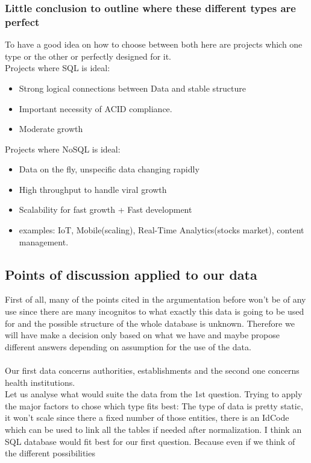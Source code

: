 \documentclass[8pt]{article}
\begin{document}
\begin{itemize}
\subsubsection{Little conclusion to outline where these different types are perfect}
To have a good idea on how to choose between both here are projects which one type or the other or perfectly designed for it.\\
Projects where SQL is ideal:\\
\begin{itemize}
\item Strong logical connections between Data and stable structure
\item Important necessity of ACID compliance.
\item Moderate growth
\end{itemize}
Projects where NoSQL is ideal:\\
\begin{itemize}
\item Data on the fly, unspecific data changing rapidly
\item High throughput to handle viral growth
\item Scalability for fast growth + Fast development
\item examples: IoT, Mobile(scaling), Real-Time Analytics(stocks market), content management.
\end{itemize}
\cite{MongoDB:2016} \cite{McNulty-Holmes:2014} \cite{Buckler:2015}

\end{itemize}
\subsection{Points of discussion applied to our data}
First of all, many of the points cited in the argumentation before won't be of any use since there are many incognitos to what exactly this data is going to be used for and the possible structure of the whole database is unknown. Therefore we will have make a decision only based on what we have and maybe propose different answers depending on assumption for the use of the data.\\\\
Our first data concerns authorities, establishments and the second one concerns health institutions.\\
Let us analyse what would suite the data from the 1st question. Trying to apply the major factors to chose which type fits best: The type of data is pretty static, it won't scale since there a fixed number of those entities, there is an IdCode which can be used to link all the tables if needed after normalization. I think an SQL database would fit best for our first question. Because even if we think of the different possibilities 
\end{document}
